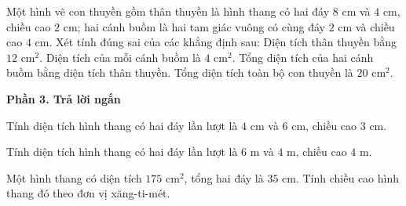 \begin{ex} %
Một hình vẽ con thuyền gồm thân thuyền là hình thang có hai đáy $8\text{ cm}$ và $4\text{ cm}$, chiều cao $2\text{ cm}$; hai cánh buồm là hai tam giác vuông có cùng đáy $2\text{ cm}$ và chiều cao $4\text{ cm}$. Xét tính đúng sai của các khẳng định sau:
\choiceTF
{\True Diện tích thân thuyền bằng $12\text{ cm}^2$.}
{\True Diện tích của mỗi cánh buồm là $4\text{ cm}^2$.}
{Tổng diện tích của hai cánh buồm bằng diện tích thân thuyền.}
{\True Tổng diện tích toàn bộ con thuyền là $20\text{ cm}^2$.}
\end{ex}

\textbf{Phần 3. Trả lời ngắn}

\begin{ex} %
Tính diện tích hình thang có hai đáy lần lượt là $4\text{ cm}$ và $6\text{ cm}$, chiều cao $3\text{ cm}$.
\end{ex}

\begin{ex} %
Tính diện tích hình thang có hai đáy lần lượt là $6\text{ m}$ và $4\text{ m}$, chiều cao $4\text{ m}$.
\end{ex}

\begin{ex} %
Một hình thang có diện tích $175\text{ cm}^2$, tổng hai đáy là $35\text{ cm}$. Tính chiều cao hình thang đó theo đơn vị xăng-ti-mét.
\end{ex}

